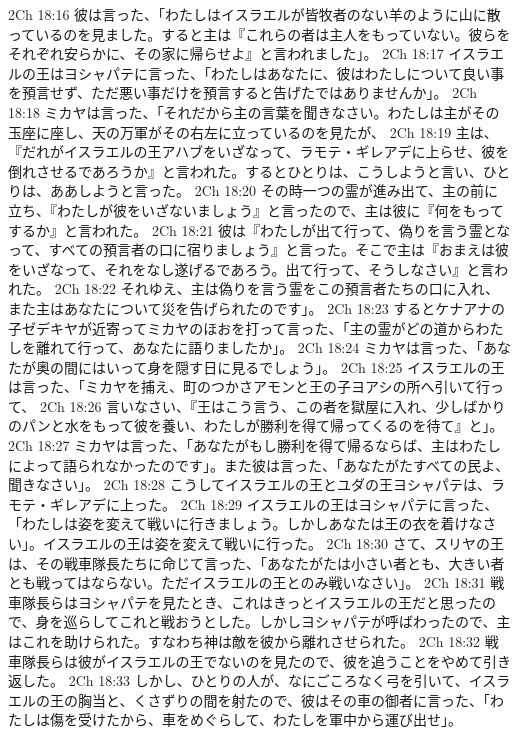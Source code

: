 2Ch 18:16  彼は言った、「わたしはイスラエルが皆牧者のない羊のように山に散っているのを見ました。すると主は『これらの者は主人をもっていない。彼らをそれぞれ安らかに、その家に帰らせよ』と言われました」。
2Ch 18:17  イスラエルの王はヨシャパテに言った、「わたしはあなたに、彼はわたしについて良い事を預言せず、ただ悪い事だけを預言すると告げたではありませんか」。
2Ch 18:18  ミカヤは言った、「それだから主の言葉を聞きなさい。わたしは主がその玉座に座し、天の万軍がその右左に立っているのを見たが、
2Ch 18:19  主は、『だれがイスラエルの王アハブをいざなって、ラモテ・ギレアデに上らせ、彼を倒れさせるであろうか』と言われた。するとひとりは、こうしようと言い、ひとりは、ああしようと言った。
2Ch 18:20  その時一つの霊が進み出て、主の前に立ち、『わたしが彼をいざないましょう』と言ったので、主は彼に『何をもってするか』と言われた。
2Ch 18:21  彼は『わたしが出て行って、偽りを言う霊となって、すべての預言者の口に宿りましょう』と言った。そこで主は『おまえは彼をいざなって、それをなし遂げるであろう。出て行って、そうしなさい』と言われた。
2Ch 18:22  それゆえ、主は偽りを言う霊をこの預言者たちの口に入れ、また主はあなたについて災を告げられたのです」。
2Ch 18:23  するとケナアナの子ゼデキヤが近寄ってミカヤのほおを打って言った、「主の霊がどの道からわたしを離れて行って、あなたに語りましたか」。
2Ch 18:24  ミカヤは言った、「あなたが奥の間にはいって身を隠す日に見るでしょう」。
2Ch 18:25  イスラエルの王は言った、「ミカヤを捕え、町のつかさアモンと王の子ヨアシの所へ引いて行って、
2Ch 18:26  言いなさい、『王はこう言う、この者を獄屋に入れ、少しばかりのパンと水をもって彼を養い、わたしが勝利を得て帰ってくるのを待て』と」。
2Ch 18:27  ミカヤは言った、「あなたがもし勝利を得て帰るならば、主はわたしによって語られなかったのです」。また彼は言った、「あなたがたすべての民よ、聞きなさい」。
2Ch 18:28  こうしてイスラエルの王とユダの王ヨシャパテは、ラモテ・ギレアデに上った。
2Ch 18:29  イスラエルの王はヨシャパテに言った、「わたしは姿を変えて戦いに行きましょう。しかしあなたは王の衣を着けなさい」。イスラエルの王は姿を変えて戦いに行った。
2Ch 18:30  さて、スリヤの王は、その戦車隊長たちに命じて言った、「あなたがたは小さい者とも、大きい者とも戦ってはならない。ただイスラエルの王とのみ戦いなさい」。
2Ch 18:31  戦車隊長らはヨシャパテを見たとき、これはきっとイスラエルの王だと思ったので、身を巡らしてこれと戦おうとした。しかしヨシャパテが呼ばわったので、主はこれを助けられた。すなわち神は敵を彼から離れさせられた。
2Ch 18:32  戦車隊長らは彼がイスラエルの王でないのを見たので、彼を追うことをやめて引き返した。
2Ch 18:33  しかし、ひとりの人が、なにごころなく弓を引いて、イスラエルの王の胸当と、くさずりの間を射たので、彼はその車の御者に言った、「わたしは傷を受けたから、車をめぐらして、わたしを軍中から運び出せ」。
